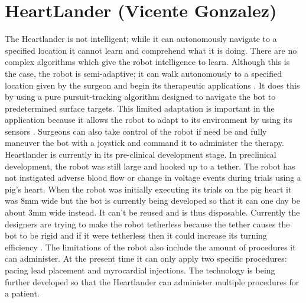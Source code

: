 \documentclass[12pt,conference]{IEEEtran}
\begin{document}
\section {HeartLander (Vicente Gonzalez)}

\indent The Heartlander is not intelligent; while it can autonomously navigate to a specified location it cannot learn and comprehend what it is doing. There are no complex algorithms which give the robot intelligence to learn. Although this is the case, the robot is semi-adaptive; it can walk autonomously to a specified location given by the surgeon and begin its therapeutic applications \cite{Boston}. It does this by using a pure pursuit-tracking algorithm designed to navigate the bot to predetermined surface targets. This limited adaptation is important in the application because it allows the robot to adapt to its environment by using its sensors \cite{Riviere}. Surgeons can also take control of the robot if need be and fully maneuver the bot with a joystick and command it to administer the therapy. Heartlander is currently in its pre-clinical development stage.
\newline
\indent In preclinical development, the robot was still large and hooked up to a tether. The robot has not instigated adverse blood flow or change in voltage events during trials using a pig's heart. When the robot was initially executing its trials on the pig heart it was 8mm wide but the bot is currently being developed so that it can one day be about 3mm wide instead. It can’t be reused and is thus disposable. Currently the designers are trying to make the robot tetherless because the tether causes the bot to be rigid and if it were tetherless then it could increase its turning efficiency \cite{Kerry}. The limitations of the robot also include the amount of procedures it can administer. At the present time it can only apply two specific procedures: pacing lead placement and myrocardial injections. The technology is being further developed so that the Heartlander can administer multiple procedures for a patient. 
\newline



\end{document}

